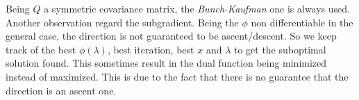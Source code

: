 \documentclass[notitlepage]{article}
\begin{document}
Being $Q$ a symmetric covariance matrix, the \textit{Bunch-Kaufman} one is always used.\\
Another observation regard the subgradient. Being the $\phi$ non differentiable in the general case, the direction is not guaranteed to be ascent/descent. So we keep track of the best $\phi(\lambda)$, best iteration, best $x$ 
and $\lambda$ to get the suboptimal solution found. This sometimes result in the dual function being minimized instead of maximized. This is due to the fact that there is no guarantee that the direction is an ascent one.\\







\end{document}

